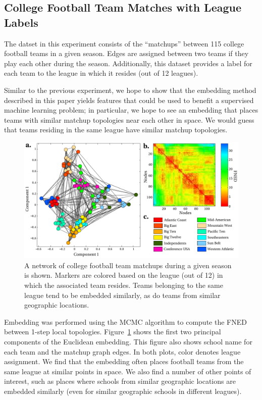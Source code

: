 \documentclass{article}
\begin{document}
\subsection{College Football Team Matches with League Labels}

The datset in this experiment consists of the ``matchups'' between 115 college football teams \cite{newman2006finding} in a given season. Edges are assigned between two teams if they play each other during the season. Additionally, this dataset provides a label for each team to the league in which it resides (out of 12 leagues). 

Similar to the previous experiment, we hope to show that the embedding method described in this paper yields features that could be used to benefit a supervised machine learning problem; in particular, we hope to see an embedding that places teams with similar matchup topologies near each other in space. We would guess that teams residing in the same league have similar matchup topologies.

\begin{figure}[h!tbp]
  \centering               
  \includegraphics[width=1\textwidth]{fig/fig4.pdf}
  \caption{A network of college football team matchups during a given season is shown. Markers are colored based on the league (out of 12) in which the associated team resides. Teams belonging to the same league tend to be embedded similarly, as do teams from similar geographic locations.}
  \label{fig:footballTeams}
\end{figure}

Embedding was performed using the MCMC algorithm to compute the FNED between 1-step local topologies. Figure~\ref{fig:footballTeams} shows the first two principal components of the Euclidean embedding. This figure also shows school name for each team and the matchup graph edges. In both plots, color denotes league assignment. We find that the embedding often places football teams from the same league at similar points in space. We also find a number of other points of interest, such as places where schools from similar geographic locations are embedded similarly (even for similar geographic schools in different leagues).
\end{document}
